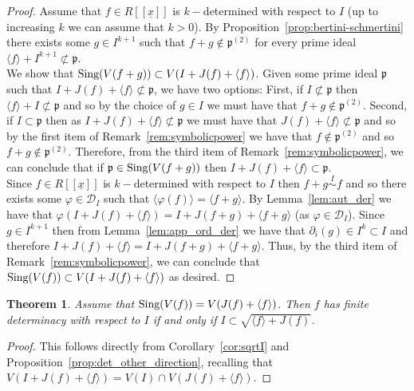 \documentclass{article}
\newtheorem{theorem}{Theorem}
\newcommand{\equivd}{\overset{I}{\sim}}
\numberwithin{theorem}{section}
\begin{document}
\begin{proof}
    Assume that $f \in R[[\underline{x}]]$ is $k-$determined with respect to $I$ (up to increasing $k$ we can assume that $k>0$). By Proposition~\ref{prop:bertini-schmertini} there exists some $g \in I^{k+1}$ such that $f+g \notin \mathfrak{p}^{(2)}$ for every prime ideal $\langle f \rangle + I^{k+1} \not\subset \mathfrak{p}$. \\
    
    We show that $\textup{Sing}(V(f+g)) \subset V(I + J(f) + \langle f \rangle)$. Given some prime ideal $\mathfrak{p}$ such that $I + J(f) + \langle f \rangle \not\subset \mathfrak{p}$, we have two options: First, if $I \not\subset \mathfrak{p}$ then $\langle f \rangle +I \not\subset \mathfrak{p}$ and so by the choice of $g \in I$ we must have that $f+g \notin \mathfrak{p}^{(2)}$. Second, if $I \subset \mathfrak{p}$ then as $I + J(f) + \langle f \rangle \not\subset \mathfrak{p}$ we must have that $J(f)+\langle f \rangle \not\subset \mathfrak{p}$ and so by the first item of Remark~\ref{rem:symbolicpower} we have that $f \notin \mathfrak{p}^{(2)}$ and so $f+g \notin \mathfrak{p}^{(2)}$. Therefore, from the third item of Remark~\ref{rem:symbolicpower}, we can conclude that if $\mathfrak{p} \in \textup{Sing}(V(f+g))$ then $I + J(f) + \langle f \rangle \subset \mathfrak{p}$.\\

    Since $f \in R[[\underline{x}]]$ is $k-$determined with respect to $I$ then $f+g \equivd f$ and so there exists some $\varphi \in \mathcal{D}_I$ such that $\langle \varphi(f) \rangle  = \langle f+g \rangle$. By Lemma~\ref{lem:aut_der} we have that $\varphi(I + J(f) + \langle f \rangle) = I + J(f+g) + \langle f+g \rangle$ (as $\varphi \in \mathcal{D}_I$). Since $g \in I^{k+1}$ then from Lemma~\ref{lem:app_ord_der} we have that $\partial_i(g) \in I^{k} \subset I$ and therefore $I + J(f) + \langle f \rangle = I + J(f+g) + \langle f+g \rangle$. Thus, by the third item of Remark~\ref{rem:symbolicpower}, we can conclude that $\textup{Sing}(V(f)) \subset V(I + J(f) + \langle f \rangle)$ as desired. 
\end{proof}

\begin{theorem}\label{thm:det_field_case}
    Assume that $\textup{Sing}(V(f)) = V(J(f) + \langle f \rangle)$. Then $f$ has finite determinacy with respect to $I$ if and only if  $I \subset \sqrt{\langle f \rangle + J(f)}$. 
\end{theorem}

\begin{proof}
    This follows directly from Corollary~\ref{cor:sqrtI} and Proposition~\ref{prop:det_other_direction}, recalling that $V(I + J(f) + \langle f \rangle) = V(I) \cap V(J(f)+\langle f \rangle)$. 
\end{proof}
\end{document}
